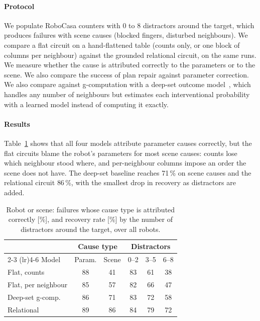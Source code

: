 \documentclass[letterpaper, 10 pt, conference]{ieeeconf}
\newcommand{\dummystyle}{\color{dummy}}
\newcommand{\dummystyle}{}
\newcommand{\dummy}[1]{{\dummystyle #1}}
\newcommand{\robocasa}{RoboCasa}
\begin{document}
\paragraph*{Protocol}
We populate \robocasa{} counters with $0$ to \dummy{$8$} distractors around the
target, which produces failures with scene causes (blocked fingers, disturbed
neighbours). We compare a flat circuit on a hand-flattened table (counts only,
or one block of columns per neighbour) against the grounded relational circuit,
on the same runs. We measure whether the cause is attributed correctly to the
parameters or to the scene. We also compare the success of plan repair against
parameter correction. We also compare against g-computation with a deep-set
outcome model~\cite{anon2027relational}, which handles any number of
neighbours but estimates each interventional probability with a learned model
instead of computing it exactly.

\paragraph*{Results}
Table~\ref{tab:relational} shows that all four models attribute parameter
causes correctly, but the flat circuits blame the robot's parameters for most
scene causes: counts lose which neighbour stood where, and per-neighbour
columns impose an order the scene does not have. The deep-set baseline reaches
\dummy{71}\,\% on scene causes and the relational circuit \dummy{86}\,\%, with
the smallest drop in recovery as distractors are added.

\begin{table}[t]
  \centering
  \caption{Robot or scene: failures whose cause type is attributed correctly
  [\%], and recovery rate [\%] by the number of distractors around the target,
  over all robots.}
  \label{tab:relational}
  \setlength{\tabcolsep}{3.5pt}
  \dummystyle
  \begin{tabular}{lccccc}
    \toprule
    & \multicolumn{2}{c}{Cause type} & \multicolumn{3}{c}{Distractors} \\
    \cmidrule(lr){2-3} \cmidrule(lr){4-6}
    Model & Param. & Scene & 0--2 & 3--5 & 6--8 \\
    \midrule
    Flat, counts         & 88 & 41 & 83 & 61 & 38 \\
    Flat, per neighbour  & 85 & 57 & 82 & 66 & 47 \\
    Deep-set g-comp.     & 86 & 71 & 83 & 72 & 58 \\
    Relational           & 89 & 86 & 84 & 79 & 72 \\
    \bottomrule
  \end{tabular}
\end{table}
\end{document}
